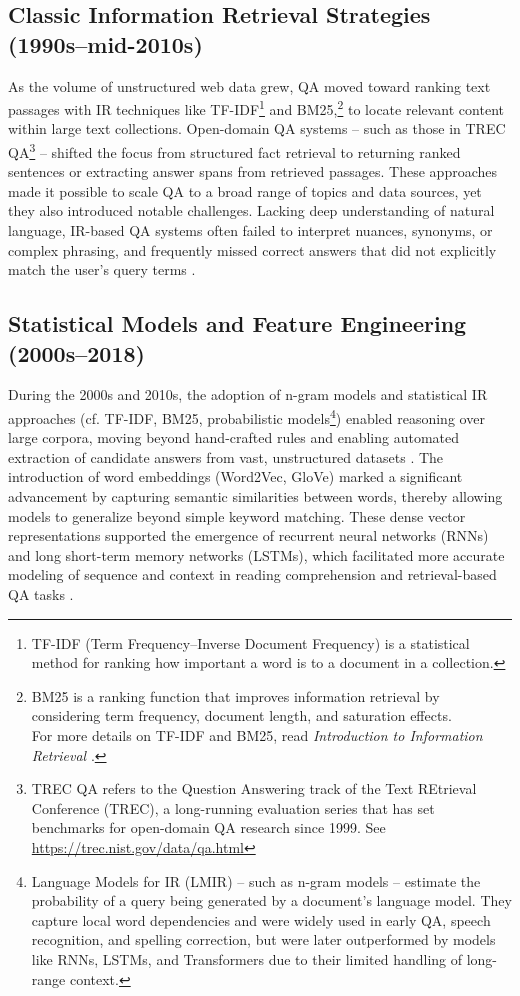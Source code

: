 \begin{spacing}{1.5}
\subsection{Classic Information Retrieval Strategies (1990s--mid-2010s)}
As the volume of unstructured web data grew, QA moved toward ranking text passages with IR techniques like TF-IDF\footnote{TF-IDF (Term Frequency–Inverse Document Frequency) is a statistical method for ranking how important a word is to a document in a collection.} and BM25,\footnote{BM25 is a ranking function that improves information retrieval by considering term frequency, document length, and saturation effects.\\For more details on TF-IDF and BM25, read \textit{Introduction to Information Retrieval} \citep{manning_introduction_2008}.} to locate relevant content within large text collections. Open-domain QA systems -- such as those in TREC QA\footnote{TREC QA refers to the Question Answering track of the Text REtrieval Conference (TREC), a long-running evaluation series that has set benchmarks for open-domain QA research since 1999. See \url{https://trec.nist.gov/data/qa.html}} \citep{hirschman_natural_2001} -- shifted the focus from structured fact retrieval to returning ranked sentences or extracting answer spans from retrieved passages. These approaches made it possible to scale QA to a broad range of topics and data sources, yet they also introduced notable challenges. Lacking deep understanding of natural language, IR-based QA systems often failed to interpret nuances, synonyms, or complex phrasing, and frequently missed correct answers that did not explicitly match the user’s query terms \citep{antoniou_survey_2022, caballero_brief_2021}.

\subsection{Statistical Models and Feature Engineering (2000s--2018)}
During the 2000s and 2010s, the adoption of n-gram models and statistical IR approaches (cf. TF-IDF, BM25, probabilistic models\footnote{Language Models for IR (LMIR) -- such as n-gram models -- estimate the probability of a query being generated by a document's language model. They capture local word dependencies and were widely used in early QA, speech recognition, and spelling correction, \citep{ponte_language_1998} but were later outperformed by models like RNNs, LSTMs, and Transformers due to their limited handling of long-range context.}) enabled reasoning over large corpora, moving beyond hand-crafted rules and enabling automated extraction of candidate answers from vast, unstructured datasets \citep{manning_introduction_2008}. The introduction of word embeddings (Word2Vec, GloVe) marked a significant advancement by capturing semantic similarities between words, thereby allowing models to generalize beyond simple keyword matching. These dense vector representations supported the emergence of recurrent neural networks (RNNs) and long short-term memory networks (LSTMs), which facilitated more accurate modeling of sequence and context in reading comprehension and retrieval-based QA tasks \citep{jurafsky_chapter_2024}. 


\end{spacing}

